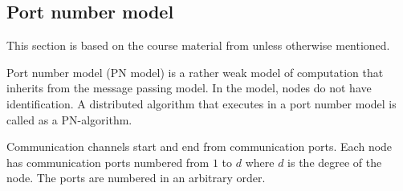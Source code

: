 






\subsection{Port number model} \label{sec:port_number_model}
This section is based on the course material from \cite{HirvonenSuomelaDistAlg2020} unless otherwise mentioned.

Port number model (PN model) is a rather weak model of computation that inherits from the message passing model.
In the model, nodes do not have identification.
A distributed algorithm that executes in a port number model is called as a PN-algorithm.


Communication channels start and end from communication ports.
Each node has communication ports numbered from $1$ to $d$ where $d$ is the degree of the node.
The ports are numbered in an arbitrary order.

